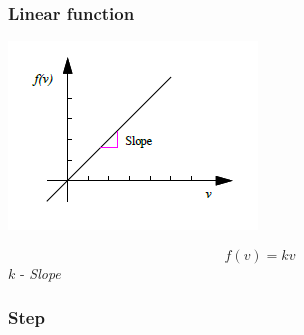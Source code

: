\subsubsection{Linear function}

\noindent
\begin{minipage}{0.45\textwidth}
  \includegraphics[width=\textwidth]{Figures/4-Functions_linear}
\end{minipage}%
\hfill\begin{minipage}{0.4\textwidth}
  $$f(v) = kv$$
  $k$ - {\sl Slope}
\end{minipage}

\subsubsection{Step}

